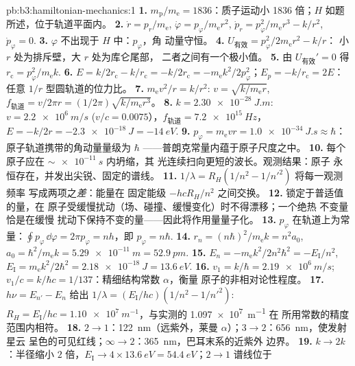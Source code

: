 \begin{solution}{pb:b3:hamiltonian-mechanics:1}
\textbf{1.} $m_{\text{p}}/m_{\text{e}} = 1836$：质子运动小 1836
倍；$H$ 如题所述，位于轨道平面内。
\textbf{2.} $\dot r = p_r/m_{\text{e}}$, $\dot\varphi =
p_\varphi/m_{\text{e}}r^2$, $\dot p_r = p_\varphi^2/m_{\text{e}}r^3 -
k/r^2$, $\dot p_\varphi = 0$.
\textbf{3.} $\varphi$ 不出现于 $H$ 中：$p_\varphi$，角
动量守恒。
\textbf{4.} $U_{\text{有效}} = p_\varphi^2/2m_{\text{e}}r^2 - k/r$：
小 $r$ 处为排斥壁，大 $r$ 处为库仑尾部，
二者之间有一个极小值。
\textbf{5.} 由 $U_{\text{有效}}' = 0$ 得 $r_{\text{c}} =
p_\varphi^2/m_{\text{e}}k$.
\textbf{6.} $E = k/2r_{\text{c}} - k/r_{\text{c}} = -k/2r_{\text{c}} =
-m_{\text{e}}k^2/2p_\varphi^2$；$E_p = -k/r_{\text{c}} = 2E$：
任意 $1/r$ 型圆轨道的位力比。
\textbf{7.} $m_{\text{e}}v^2/r = k/r^2$: $v = \sqrt{k/m_{\text{e}}r}$,
$f_{\text{轨道}} = v/2\pi r = (1/2\pi)\sqrt{k/m_{\text{e}}r^3}$。
\textbf{8.} $k = \qty{2.30e-28}{J.m}$: $v = \qty{2.2e6}{m/s}$ ($v/c =
0.0075$），$f_{\text{轨道}} = \qty{7.2e15}{Hz}$，$E = -k/2r =
\qty{-2.3e-18}{J} = \qty{-14}{eV}$.
\textbf{9.} $p_\varphi = m_{\text{e}}vr = \qty{1.0e-34}{J.s} \approx
\hbar$：原子轨道携带的角动量量级为 $\hbar$
——普朗克常量内蕴于原子尺度之中。
\textbf{10.} 每个原子应在 $\sim\qty{e-11}{s}$ 内坍缩，其
光连续扫向更短的波长。观测结果：原子
永恒存在，并发出尖锐、固定的谱线。
\textbf{11.} $1/\lambda = R_H(1/n^2 - 1/n'^2)$ 将每一观测频率
写成两项之\emph{差}：能量在
固定能级 $-hcR_H/n^2$ 之间交换。
\textbf{12.} 锁定于普适值的量，在
原子受缓慢扰动（场、碰撞、缓慢变化）时不得漂移；一个绝热
不变量恰是在缓慢
扰动下保持不变的量——因此将作用量量子化。
\textbf{13.} $p_\varphi$ 在轨道上为常量：$\oint
p_\varphi\,\dd\varphi = 2\pi p_\varphi = nh$，即 $p_\varphi =
n\hbar$.
\textbf{14.} $r_n = (n\hbar)^2/m_{\text{e}}k = n^2a_0$, $a_0 =
\hbar^2/m_{\text{e}}k = \qty{5.29e-11}{m} = \qty{52.9}{pm}$.
\textbf{15.} $E_n = -m_{\text{e}}k^2/2n^2\hbar^2 = -E_{\text{I}}/n^2$,
$E_{\text{I}} = m_{\text{e}}k^2/2\hbar^2 = \qty{2.18e-18}{J} =
\qty{13.6}{eV}$.
\textbf{16.} $v_1 = k/\hbar = \qty{2.19e6}{m/s}$; $v_1/c = k/\hbar c =
1/137$：精细结构常数 $\alpha$，衡量
原子的非相对论性程度。
\textbf{17.} $h\nu = E_{n'} - E_n$ 给出 $1/\lambda =
(E_{\text{I}}/hc)(1/n^2 - 1/n'^2)$: $R_H = E_{\text{I}}/hc =
\qty{1.10e7}{m^{-1}}$，与实测的 \qty{1.097e7}{m^{-1}} 在
所用常数的精度范围内相符。
\textbf{18.} $2 \to 1$：\qty{122}{nm}（远紫外，莱曼
$\alpha$）；$3 \to 2$：\qty{656}{nm}，使发射星云
呈色的可见红线；$\infty \to 2$：\qty{365}{nm}，巴耳末系的近紫外
边界。
\textbf{19.} $k \to 2k$：半径缩小 $2$ 倍，$E_{\text{I}} \to
4 \times \qty{13.6}{eV} = \qty{54.4}{eV}$；$2 \to 1$ 谱线位于

\end{solution}

